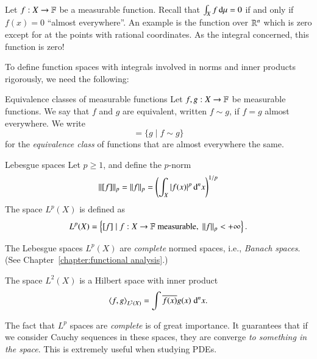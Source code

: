 Let $f : X \to \mathbb{F}$ be a measurable function. Recall that $\int_X f\, \mathrm{d} \mu=0$ if and only if $f(x)=0$ ``almost everywhere''. An example is the function over $\mathbb{R}^n$ which is zero except for at the points with rational coordinates. As the integral concerned, this function is zero!



To define function spaces with integrals involved in norms and inner products rigorously, we need the following:
\begin{myDefinition}{Equivalence classes of measurable functions}{}
    Let $f,g : X \to \mathbb{F}$ be measurable functions. We say that $f$ and $g$ are equivalent, written $f\sim g$, if $f=g$ almost everywhere. We write
    \begin{equation}
        [f] = \{ g \mid f\sim g\}
    \end{equation}
    for the \emph{equivalence class} of functions that are almost everywhere the same.
\end{myDefinition}


\begin{myDefinition}{Lebesgue spaces}{}
    Let $p\geq 1$, and define the $p$-norm
    \begin{equation}
        \|[f]\|_p = \|f\|_p = \left( \int_X |f(x)|^p \, \mathrm{d}^n x\right)^{1/p}
    \end{equation}
    The space $L^p(X)$ is defined as
    \begin{equation}
        L^p(X) = \left\{ [f] \mid f : X \to \mathbb{F} \;\text{measurable},\; \|f\|_p < +\infty \right\}.
    \end{equation}
\end{myDefinition}

\begin{myTheorem}{}{}
    The Lebesgue spaces $L^p(X)$ are \emph{complete} normed spaces, i.e., \emph{Banach spaces}. (See Chapter~\ref{chapter:functional analysis}.)

    The space $L^2(X)$ is a Hilbert space with inner product
    \begin{equation}
        \braket{f,g}_{L^2(X)} = \int \overline{f(x)} g(x) \; \mathrm{d}^n x.
    \end{equation}    
\end{myTheorem}

The fact that $L^p$ spaces are \emph{complete} is of great importance. It guarantees that if we consider Cauchy sequences in these spaces, they are converge \emph{to something in the space}. This is extremely useful when studying PDEs.

